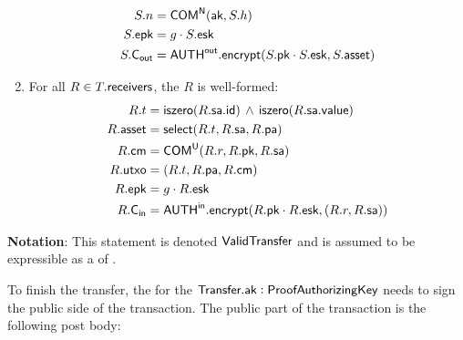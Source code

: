 \begin{definition}
\begin{enumerate}
\begin{align*}
                S.n      &= {\textsf{COM}}^{{\textsf{N}}}({\textsf{ak}}, S.h) \\
                S.{\textsf{epk}}   &= g \cdot S.{\textsf{esk}} \\
                S.{\textsf{C}_\textsf{out}}  &= {{\textsf{AUTH}}^\textsf{out}}.{\textsf{encrypt}}(S.{\textsf{pk}} \cdot S.{\textsf{esk}}, S.{\textsf{asset}})
            \end{align*}
        \item For all $R \in T.{\textsf{receivers}}$, the \Receiver{} $R$ is well-formed:
            \begin{align*}
                R.t      &= {\textsf{iszero}}(R.{\textsf{sa}}.{\textsf{id}}) \,\wedge\, {\textsf{iszero}}(R.{\textsf{sa}}.{\textsf{value}}) \\
                R.{\textsf{asset}} &= {\textsf{select}}(R.t, R.{\textsf{sa}}, R.{\textsf{pa}}) \\
                R.{\textsf{cm}}    &= {\textsf{COM}}^{{\textsf{U}}}(R.r, R.{\textsf{pk}}, R.{\textsf{sa}}) \\
                R.{\textsf{utxo}}  &= (R.t, R.{\textsf{pa}}, R.{\textsf{cm}}) \\
                R.{\textsf{epk}}   &= g \cdot R.{\textsf{esk}} \\
                R.{\textsf{C}_\textsf{in}}   &= {{\textsf{AUTH}}^\textsf{in}}.{\textsf{encrypt}}(R.{\textsf{pk}} \cdot R.{\textsf{esk}}, (R.r, R.{\textsf{sa}}))
            \end{align*}
    \end{enumerate}
    \textbf{Notation}: This statement is denoted ${\textsf{ValidTransfer}}$ and is assumed to be expressible as a \Statement{} of \NIZK{}.
\end{definition}

To finish the transfer, the \SpendingKey{} for the ${\textsf{Transfer}}.{\textsf{ak}} : {\textsf{ProofAuthorizingKey}}$ needs to sign the public side of the transaction. The public part of the transaction is the following post body:


